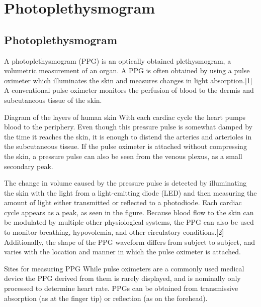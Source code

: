 \chapter{Photoplethysmogram} %

\label{Chapter5} %


\section{Photoplethysmogram}
\cite{wiki-PPG}
A photoplethysmogram (PPG) is an optically obtained plethysmogram, 
a volumetric measurement of an organ. 
A PPG is often obtained by using a pulse oximeter 
which illuminates the skin and measures changes in light absorption.[1] 
A conventional pulse oximeter monitors the perfusion of blood to the dermis 
and subcutaneous tissue of the skin.

Diagram of the layers of human skin With each cardiac cycle the heart pumps 
blood to the periphery. Even though this pressure pulse is somewhat damped 
by the time it reaches the skin, it is enough to distend the arteries and 
arterioles in the subcutaneous tissue. 
If the pulse oximeter is attached without compressing the skin, 
a pressure pulse can also be seen from the venous plexus, as a small secondary peak.

The change in volume caused by the pressure pulse is detected by illuminating the skin 
with the light from a light-emitting diode (LED) and then measuring the amount of 
light either transmitted or reflected to a photodiode. 
Each cardiac cycle appears as a peak, as seen in the figure. 
Because blood flow to the skin can be modulated by multiple other physiological systems, 
the PPG can also be used to monitor breathing, hypovolemia, 
and other circulatory conditions.[2] Additionally, the shape of the PPG waveform 
differs from subject to subject, and varies with the location and 
manner in which the pulse oximeter is attached.

Sites for measuring PPG
While pulse oximeters are a commonly used medical device the PPG derived from them is 
rarely displayed, and is nominally only processed to determine heart rate. 
PPGs can be obtained from transmissive absorption (as at the finger tip) or 
reflection (as on the forehead).

